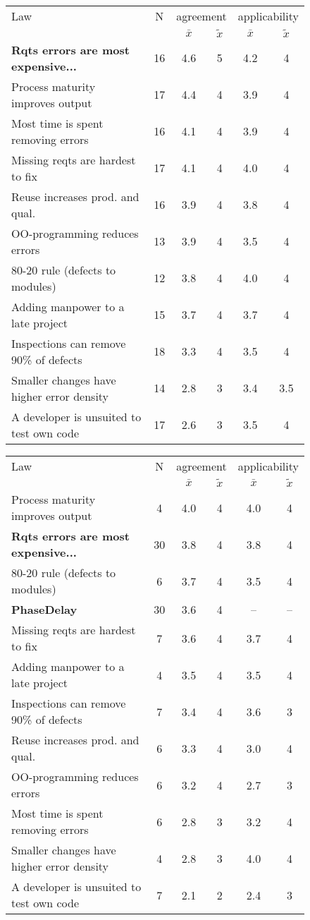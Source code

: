 \begin{figure}[!h]
\renewcommand{\baselinestretch}{0.7}
\scriptsize
\begin{center}
\begin{tabular}{l|c|c|c|c|c}
Law & N & \multicolumn{2}{c}{agreement} & \multicolumn{2}{c}{applicability} \\ 
 & & $\bar{x}$ & $\tilde{x}$ & $\bar{x}$ & $\tilde{x}$ \\
\hline 
\textbf{Rqts errors are most expensive...} & 16 & 4.6 & 5 & 4.2 & 4 \\ 
Process maturity improves output & 17 & 4.4 & 4 & 3.9 & 4 \\ 
Most time is spent removing errors & 16 & 4.1 & 4 & 3.9 & 4 \\ 
Missing reqts are hardest to fix & 17 & 4.1 & 4 & 4.0 & 4 \\
Reuse increases prod. and qual. & 16 & 3.9 & 4 & 3.8 & 4 \\
OO-programming reduces errors & 13 & 3.9 & 4 & 3.5 & 4 \\
80-20 rule (defects to modules) & 12 & 3.8 & 4 & 4.0 & 4 \\
Adding manpower to a late project & 15 & 3.7 & 4 & 3.7 & 4 \\
Inspections can remove 90\% of defects & 18 & 3.3 & 4 & 3.5 & 4 \\
Smaller changes have higher error density & 14 & 2.8 & 3 & 3.4 & 3.5 \\
A developer is unsuited to test own code & 17 & 2.6 & 3 & 3.5 & 4
\end{tabular} 
\bigskip
{}
\begin{tabular}{l|c|c|c|c|c}
Law & N & \multicolumn{2}{c}{agreement} & \multicolumn{2}{c}{applicability} \\ 
 & & $\bar{x}$ & $\tilde{x}$ & $\bar{x}$ & $\tilde{x}$ \\
\hline 
Process maturity improves output & 4 & 4.0 & 4 & 4.0 & 4 \\
\textbf{Rqts errors are most expensive...} & 30 & 3.8 & 4 & 3.8 & 4   \\ 
80-20 rule (defects to modules) & 6 & 3.7 & 4 & 3.5 & 4 \\
\textbf{PhaseDelay} & 30 & 3.6 & 4 & -- & --  \\ 
Missing reqts are hardest to fix & 7 & 3.6 & 4 & 3.7 & 4 \\
Adding manpower to a late project & 4 & 3.5 & 4 & 3.5 & 4 \\
Inspections can remove 90\% of defects & 7 & 3.4 & 4 & 3.6 & 3 \\
Reuse increases prod. and qual. & 6 & 3.3 & 4 & 3.0 & 4 \\
OO-programming reduces errors & 6 & 3.2 & 4 & 2.7 & 3 \\
Most time is spent removing errors & 6 & 2.8 & 3 & 3.2 & 4 \\ 
Smaller changes have higher error density & 4 & 2.8 & 3 & 4.0 & 4 \\
A developer is unsuited to test own code & 7 & 2.1 & 2 & 2.4 & 3
\end{tabular} 


\end{center}
\end{figure}
